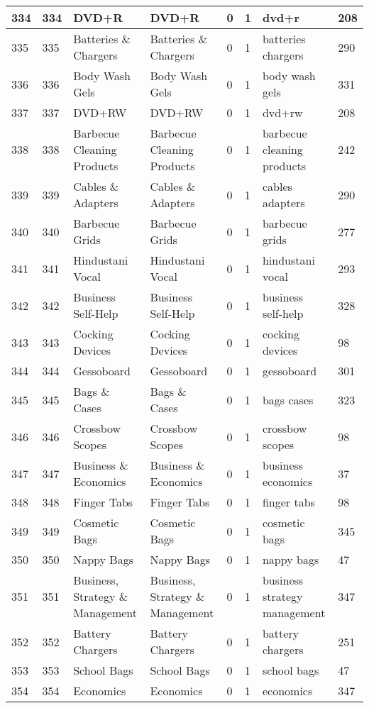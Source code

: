 \begin{longtable}{|l|l|l|l|l|l|l|l|}
334 & 334 & DVD+R & DVD+R & 0 & 1 & dvd+r & 208 \\ \hline 
335 & 335 & Batteries \& Chargers & Batteries \& Chargers & 0 & 1 & batteries chargers & 290 \\ \hline 
336 & 336 & Body Wash Gels & Body Wash Gels & 0 & 1 & body wash gels & 331 \\ \hline 
337 & 337 & DVD+RW & DVD+RW & 0 & 1 & dvd+rw & 208 \\ \hline 
338 & 338 & Barbecue Cleaning Products & Barbecue Cleaning Products & 0 & 1 & barbecue cleaning products & 242 \\ \hline 
339 & 339 & Cables \& Adapters & Cables \& Adapters & 0 & 1 & cables adapters & 290 \\ \hline 
340 & 340 & Barbecue Grids & Barbecue Grids & 0 & 1 & barbecue grids & 277 \\ \hline 
341 & 341 & Hindustani Vocal & Hindustani Vocal & 0 & 1 & hindustani vocal & 293 \\ \hline 
342 & 342 & Business Self-Help & Business Self-Help & 0 & 1 & business self-help & 328 \\ \hline 
343 & 343 & Cocking Devices & Cocking Devices & 0 & 1 & cocking devices & 98 \\ \hline 
344 & 344 & Gessoboard & Gessoboard & 0 & 1 & gessoboard & 301 \\ \hline 
345 & 345 & Bags \& Cases & Bags \& Cases & 0 & 1 & bags cases & 323 \\ \hline 
346 & 346 & Crossbow Scopes & Crossbow Scopes & 0 & 1 & crossbow scopes & 98 \\ \hline 
347 & 347 & Business \& Economics & Business \& Economics & 0 & 1 & business economics & 37 \\ \hline 
348 & 348 & Finger Tabs & Finger Tabs & 0 & 1 & finger tabs & 98 \\ \hline 
349 & 349 & Cosmetic Bags & Cosmetic Bags & 0 & 1 & cosmetic bags & 345 \\ \hline 
350 & 350 & Nappy Bags & Nappy Bags & 0 & 1 & nappy bags & 47 \\ \hline 
351 & 351 & Business, Strategy \& Management & Business, Strategy \& Management & 0 & 1 & business strategy management & 347 \\ \hline 
352 & 352 & Battery Chargers & Battery Chargers & 0 & 1 & battery chargers & 251 \\ \hline 
353 & 353 & School Bags & School Bags & 0 & 1 & school bags & 47 \\ \hline 
354 & 354 & Economics & Economics & 0 & 1 & economics & 347 \\ \hline 

\end{longtable}
